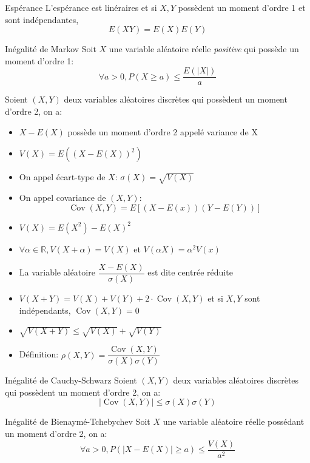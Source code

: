 \documentclass[french, a4paper, 10pt, twocolumn]{article}
\newcommand{\R}{\mathbb{R}}   %
\DeclareMathOperator{\cov}{Cov}
\begin{document}
\begin{theoreme}{Espérance}
  L'espérance est linéraires et si \(X,Y\) possèdent un moment d'ordre 1 et sont indépendantes,
  \[E(XY)=E(X)E(Y)\]
\end{theoreme}

\begin{theoreme}{Inégalité de Markov}
  Soit $X$ une variable aléatoire réelle \emph{positive} qui possède un moment d'ordre 1:
  \[\forall a>0, {P(X\geqslant a)\leqslant \frac{E(|X|)}{a}}\]
\end{theoreme}

\begin{definition}
  Soient \((X,Y)\) deux variables aléatoires discrètes qui possèdent un moment d'ordre 2, on a:
  \begin{itemize}[label=\(\bullet\)]
    \item \(X-E(X)\) possède un moment d'ordre 2 appelé variance de X
    \item \(V(X)=E\left({(X-E(X))}^2\right)\)
    \item On appel écart-type de \(X\): \(\sigma(X)=\sqrt{V(X)}\)
    \item On appel covariance de \((X,Y)\): \[\cov(X,Y)=E\left[(X-E(x))(Y-E(Y))\right]\]
  \end{itemize}
  \tcblower
  \begin{itemize}
    \item \(V(X)=E(X^2)-{E(X)}^2\)
    \item \(\forall \alpha \in \R, V(X+\alpha)=V(X)\) et \(V(\alpha X)=\alpha^2V(x)\)
    \item La variable aléatoire \(\dfrac{X-E(X)}{\sigma(X)}\) est dite centrée réduite
    \item \(V(X+Y)=V(X)+V(Y)+2\cdot\cov(X,Y)\) et si \(X,Y\) sont indépendants, \(\cov(X,Y)=0\)
    \item \(\sqrt{V(X+Y)}\leqslant \sqrt{V(X)}+\sqrt{V(Y)}\)
    \item Définition: \(\rho(X,Y)=\dfrac{\cov(X,Y)}{\sigma(X)\sigma(Y)}\)
  \end{itemize}
\end{definition}

\begin{theoreme}{Inégalité de Cauchy-Schwarz}
  Soient \((X,Y)\) deux variables aléatoires discrètes qui possèdent un moment d'ordre 2, on a:
  \[\left\lvert\cov(X,Y)\right\rvert \leqslant \sigma(X)\sigma(Y)\]
\end{theoreme}

\begin{theoreme}{Inégalité de Bienaymé-Tchebychev}
  Soit $X$ une variable aléatoire réelle possédant un moment d'ordre 2, on a:
  \[\forall a>0, P\left(|X-E(X)|\geqslant a\right)\leqslant \frac{V(X)}{a^2}\]
\end{theoreme}
\end{document}
